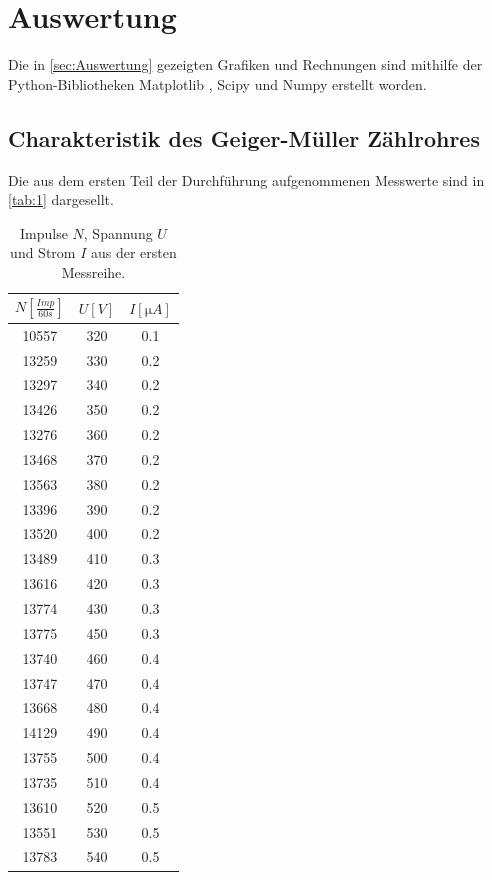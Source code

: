 \section{Auswertung}
\label{sec:Auswertung}
Die in \autoref{sec:Auswertung} gezeigten Grafiken und Rechnungen sind mithilfe der Python-Bibliotheken Matplotlib \cite{matplotlib}, Scipy \cite{scipy} und Numpy \cite{numpy}
erstellt worden.

\subsection{Charakteristik des Geiger-Müller Zählrohres}
Die aus dem ersten Teil der Durchführung aufgenommenen Messwerte sind in \autoref{tab:1} dargesellt.

\begin{table}[H]
  \centering
  \caption{Impulse $N$, Spannung $U$ und Strom $I$ aus der ersten Messreihe.}
  \begin{tabular}{c c c}
      \toprule
      {$N[\unit{\frac{Imp}{60s}}]$} & {$U[\unit{V}]$} & {$I[\unit{\micro A}]$}\\
      \midrule
      10557 & 320 & 0.1\\
      13259 & 330 & 0.2\\
      13297 & 340 & 0.2\\
      13426 & 350 & 0.2\\
      13276 & 360 & 0.2\\
      13468 & 370 & 0.2\\
      13563 & 380 & 0.2\\
      13396 & 390 & 0.2\\
      13520 & 400 & 0.2\\
      13489 & 410 & 0.3\\
      13616 & 420 & 0.3\\
      13774 & 430 & 0.3\\
      13775 & 450 & 0.3\\
      13740 & 460 & 0.4\\
      13747 & 470 & 0.4\\
      13668 & 480 & 0.4\\
      14129 & 490 & 0.4\\
      13755 & 500 & 0.4\\
      13735 & 510 & 0.4\\
      13610 & 520 & 0.5\\
      13551 & 530 & 0.5\\
      13783 & 540 & 0.5\\

\end{tabular}
\end{table}
